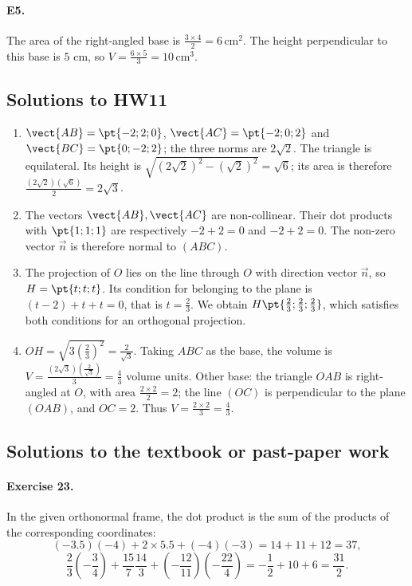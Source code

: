 \paragraph{E5.}The area of the right-angled base is $\frac{3\times4}{2}=6\,\mathrm{cm}^2$. The height perpendicular to this base is $5$ cm, so $V=\frac{6\times5}{3}=10\,\mathrm{cm}^3$.

\subsection{Solutions to HW11}\begin{enumerate}
\item $\vect{AB}=\pt{-2;2;0}$, $\vect{AC}=\pt{-2;0;2}$ and $\vect{BC}=\pt{0;-2;2}$; the three norms are $2\sqrt2$. The triangle is equilateral. Its height is $\sqrt{(2\sqrt2)^2-(\sqrt2)^2}=\sqrt6$; its area is therefore $\frac{(2\sqrt2)(\sqrt6)}{2}=2\sqrt{3}$.
\item The vectors $\vect{AB},\vect{AC}$ are non-collinear. Their dot products with $\pt{1;1;1}$ are respectively $-2+2=0$ and $-2+2=0$. The non-zero vector $\vec n$ is therefore normal to $(ABC)$.
\item The projection of $O$ lies on the line through $O$ with direction vector $\vec n$, so $H=\pt{t;t;t}$. Its condition for belonging to the plane is $(t-2)+t+t=0$, that is $t=\frac{2}{3}$. We obtain $H\pt{\frac{2}{3};\frac{2}{3};\frac{2}{3}}$, which satisfies both conditions for an orthogonal projection.
\item $OH=\sqrt{3(\frac{2}{3})^2}=\frac{2}{\sqrt{3}}$. Taking $ABC$ as the base, the volume is $V=\frac{(2\sqrt3)(\frac{2}{\sqrt{3}})}{3}=\frac{4}{3}$ volume units. Other base: the triangle $OAB$ is right-angled at $O$, with area $\frac{2\times2}{2}=2$; the line $(OC)$ is perpendicular to the plane $(OAB)$, and $OC=2$. Thus $V=\frac{2\times2}{3}=\frac{4}{3}$.
\end{enumerate}

\subsection{Solutions to the textbook or past-paper work}\paragraph{Exercise 23.} In the given orthonormal frame, the dot product is the sum of the products of the corresponding coordinates:
\[(-\num{3,5})(-4)+2\times\num{5,5}+(-4)(-3)=14+11+12=37,\]
\[\frac23\left(-\frac34\right)+\frac{15}7\frac{14}3+\left(-\frac{12}{11}\right)\left(-\frac{22}4\right)=-\frac12+10+6=\frac{31}2.\]
